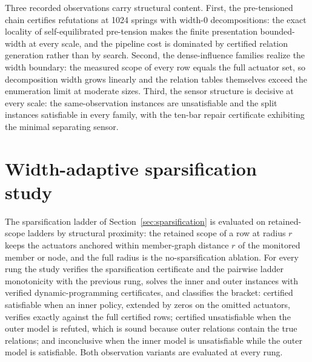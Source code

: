 \documentclass[11pt]{article}
\theoremstyle{plain}
\theoremstyle{definition}
\theoremstyle{remark}
\begin{document}
Three recorded observations carry structural content.  First, the
pre-tensioned chain certifies refutations at 1024 springs with width-0
decompositions: the exact locality of self-equilibrated pre-tension makes
the finite presentation bounded-width at every scale, and the pipeline cost
is dominated by certified relation generation rather than by search.  Second,
the dense-influence families realize the width boundary: the measured scope
of every row equals the full actuator set, so decomposition width grows
linearly and the relation tables themselves exceed the enumeration limit at
moderate sizes.  Third, the sensor structure is decisive at every scale: the
same-observation instances are unsatisfiable and the split instances
satisfiable in every family, with the ten-bar repair certificate exhibiting
the minimal separating sensor.

\section{Width-adaptive sparsification study}
\label{sec:sparsification-study}

The sparsification ladder of Section~\ref{sec:sparsification} is evaluated
on retained-scope ladders by structural proximity: the retained scope of a
row at radius \(r\) keeps the actuators anchored within member-graph
distance \(r\) of the monitored member or node, and the full radius is the
no-sparsification ablation.  For every rung the study verifies the
sparsification certificate and the pairwise ladder monotonicity with the
previous rung, solves the inner and outer instances with verified
dynamic-programming certificates, and classifies the bracket: certified
satisfiable when an inner policy, extended by zeros on the omitted
actuators, verifies exactly against the full certified rows; certified
unsatisfiable when the outer model is refuted, which is sound because outer
relations contain the true relations; and inconclusive when the inner model
is unsatisfiable while the outer model is satisfiable.  Both observation
variants are evaluated at every rung.
\end{document}
